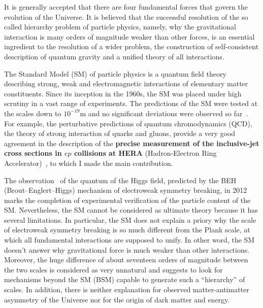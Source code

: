 \textcolor{\mycolor}{
It is generally accepted that there are four fundamental forces that govern the evolution of the Universe. It is believed that the successful resolution of the so called hierarchy problem of particle physics, namely, why the gravitational interaction is many orders of magnitude weaker than other forces, is an essential ingredient to the resolution of a wider problem, the construction of self-consistent description of quantum gravity and a unified theory of all interactions.}

\textcolor{\mycolor}{
The Standard Model (SM) of particle physics is a quantum field theory describing strong, weak and electromagnetic interactions of elementary matter constituents. Since its inception in the 1960s, the SM was placed under high scrutiny in a vast range of experiments. The predictions of the SM were tested at the scales down to $10^{-19}$m and no significant deviations were observed so far~\cite{Agashe:2014kda}. For example, the perturbative predictions of quantum chromodynamics (QCD), the theory of strong interaction of quarks and gluons, provide a very good agreement in the description of the \textbf{precise measurement of the inclusive-jet cross sections in $ep$ collisions at HERA} (Hadron-Electron Ring Accelerator)~\cite{Abramowicz:2012jz}, to which I made the main contribution.}

\textcolor{\mycolor}{
The observation~\cite{Aad:2012tfa,Chatrchyan:2012xdj} of the quantum of the Higgs field, predicted by the BEH (Brout--Englert--Higgs) mechanism of electroweak symmetry breaking, in 2012 marks the completion of experimental verification of the particle content of the SM. Nevertheless, the SM cannot be considered as ultimate theory because it has several limitations. In particular, the SM does not explain a priory why the scale of electroweak symmetry breaking is so much different from the Plank scale, at which all fundamental interactions are supposed to unify. In other word, the SM doesn't answer why gravitational force is much weaker than other interactions. Moreover, the huge difference of about seventeen orders of magnitude between the two scales is considered as very unnatural and suggests to look for mechanisms beyond the SM (BSM) capable to generate such a ``hierarchy'' of scales. In addition, there is neither explanation for observed matter-antimatter asymmetry of the Universe nor for the origin of dark matter and energy.}

